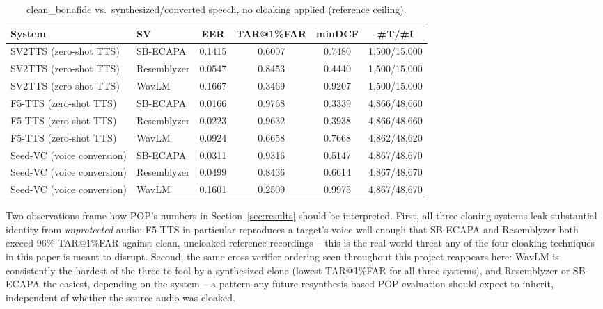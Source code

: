 \documentclass[11pt]{article}
\begin{document}
\begin{table}[H]
\centering
\caption{clean\_bonafide vs.\ synthesized/converted speech, no cloaking applied (reference ceiling).}
\label{tab:synth-ceiling}
\begin{tabular}{llcccc}
\toprule
System & SV & EER & TAR@1\%FAR & minDCF & \#T/\#I \\
\midrule
SV2TTS (zero-shot TTS)   & SB-ECAPA    & 0.1415 & 0.6007 & 0.7480 & 1{,}500/15{,}000 \\
SV2TTS (zero-shot TTS)   & Resemblyzer & 0.0547 & 0.8453 & 0.4440 & 1{,}500/15{,}000 \\
SV2TTS (zero-shot TTS)   & WavLM       & 0.1667 & 0.3469 & 0.9207 & 1{,}500/15{,}000 \\
\addlinespace
F5-TTS (zero-shot TTS)   & SB-ECAPA    & 0.0166 & 0.9768 & 0.3339 & 4{,}866/48{,}660 \\
F5-TTS (zero-shot TTS)   & Resemblyzer & 0.0223 & 0.9632 & 0.3938 & 4{,}866/48{,}660 \\
F5-TTS (zero-shot TTS)   & WavLM       & 0.0924 & 0.6658 & 0.7668 & 4{,}862/48{,}620 \\
\addlinespace
Seed-VC (voice conversion) & SB-ECAPA    & 0.0311 & 0.9316 & 0.5147 & 4{,}867/48{,}670 \\
Seed-VC (voice conversion) & Resemblyzer & 0.0499 & 0.8436 & 0.6614 & 4{,}867/48{,}670 \\
Seed-VC (voice conversion) & WavLM       & 0.1601 & 0.2509 & 0.9975 & 4{,}867/48{,}670 \\
\bottomrule
\end{tabular}
\end{table}

Two observations frame how POP's numbers in Section~\ref{sec:results}
should be interpreted. First, all three cloning systems leak
substantial identity from \emph{unprotected} audio: F5-TTS in
particular reproduces a target's voice well enough that SB-ECAPA and
Resemblyzer both exceed 96\% TAR@1\%FAR against clean, uncloaked
reference recordings -- this is the real-world threat any of the four
cloaking techniques in this paper is meant to disrupt. Second, the
same cross-verifier ordering seen throughout this project reappears
here: WavLM is consistently the hardest of the three to fool by a
synthesized clone (lowest TAR@1\%FAR for all three systems), and
Resemblyzer or SB-ECAPA the easiest, depending on the system -- a
pattern any future resynthesis-based POP evaluation should expect to
inherit, independent of whether the source audio was cloaked.
\end{document}
